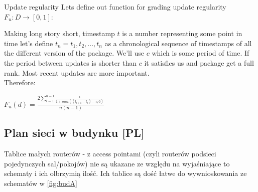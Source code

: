 \textbf{}{Update regularity}
Lets define out function for grading update regularity $F_u:D \rightarrow [0,1]$:

Making long story short, timestamp $t$ is a number representing some point in time let's define $t_n = t_1, t_2, ... , t_n$ as a chronological sequence of timestamps of all the different version of the package. We'll use $c$ which is some period of time. If the period between updates is shorter than $c$ it satisfies us and package get a full rank. Most recent updates are more important.\\
Therefore:
\begin{deff}
\Large $F_u(d) = \frac{2 \sum_{i=1}^{n-1} \frac{i}
                         {1+max((t_{i+1}-t_i)-c, 0)}}
         {n(n-1)}$
\end{deff}
\hline


\subsection{Plan sieci w budynku [PL]}
{\uwaga
    Tablice małych routerów - z access pointami (czyli routerów podsieci pojedynczych sal/pokojów) nie są ukazane ze względu na wyjaśniające to schematy i ich olbrzymią ilość. Ich tablice są dość łatwe do wywnioskowania ze schematów w \ref{fig:budA}
    }
